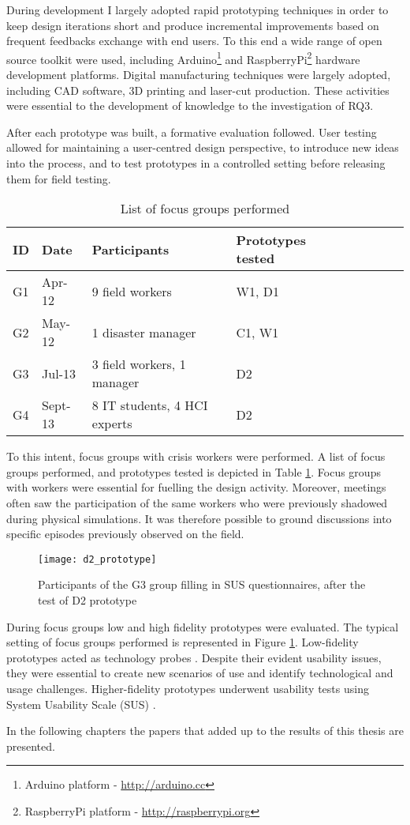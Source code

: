 During development I largely adopted rapid prototyping techniques in order to keep design iterations short and produce incremental improvements based on frequent feedbacks exchange with end users. To this end a wide range of open source toolkit were used, including Arduino\footnote{Arduino platform - \url{http://arduino.cc}} and RaspberryPi\footnote{RaspberryPi platform - \url{http://raspberrypi.org}} hardware development platforms. Digital manufacturing techniques were largely adopted, including CAD software, 3D printing and laser-cut production. These activities were essential to the development of knowledge to the investigation of RQ3. 

After each prototype was built, a formative evaluation followed. User testing allowed for maintaining a user-centred design perspective, to introduce new ideas into the process, and to test prototypes in a controlled setting before releasing them for field testing.

\begin{table}
	[h] \centering \caption{List of focus groups performed} \label{labtests} 
	\begin{tabular}
		{@{}lllllllll@{}} \toprule 
		ID & Date & Participants & Prototypes tested \\
		\midrule 
		G1 & Apr-12 & 9 field workers & W1, D1 \\
		G2 & May-12 & 1 disaster manager & C1, W1 \\
		G3 & Jul-13 & 3 field workers, 1 manager & D2 \\
		G4 & Sept-13 & 8 IT students, 4 HCI experts & D2 \\
		\bottomrule 
	\end{tabular}
\end{table}

To this intent, focus groups with crisis workers were performed. A list of focus groups performed, and prototypes tested is depicted in Table \ref{labtests}. Focus groups with workers were essential for fuelling the design activity. Moreover, meetings often saw the participation of the same workers who were previously shadowed during physical simulations. It was therefore possible to ground discussions into specific episodes previously observed on the field.

\begin{figure}
	[tbh] \centering 
	\texttt{[image: d2\_prototype]} \caption{Participants of the G3 group filling in SUS questionnaires, after the test of D2 prototype} \label{fig:focus-group} 
\end{figure}

During focus groups low and high fidelity prototypes were evaluated. The typical setting of focus groups performed is represented in Figure \ref{fig:focus-group}. Low-fidelity prototypes acted as technology probes \autocite{Hutchinson:2003il}. Despite their evident usability issues, they were essential to create new scenarios of use and identify technological and usage challenges. Higher-fidelity prototypes underwent usability tests \autocite{Dumas:2009th} using System Usability Scale (SUS) \autocite[page 189]{jordan1996usability}.

In the following chapters the papers that added up to the results of this thesis are presented.
